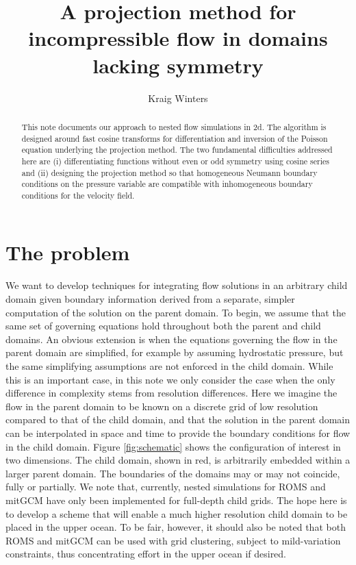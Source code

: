 \documentclass{jfm-like}
\title{A projection method for incompressible flow in domains lacking symmetry}
\author{Kraig Winters
  }
\affiliation{Scripps Institution of Oceanography, University of California San Diego,
La Jolla, CA 92093, USA
}
\begin{document}
\maketitle

\begin{abstract}
This note documents our approach to nested flow simulations in 2d. The algorithm is designed around fast cosine transforms for differentiation and inversion of the Poisson equation
underlying the projection method. The two fundamental difficulties addressed here are (i) differentiating functions without even or odd symmetry using cosine series and (ii) designing
the projection method so that homogeneous Neumann boundary conditions on the pressure variable are compatible with  inhomogeneous boundary conditions for the velocity field.
\end{abstract}


\section{The problem}
We want to develop techniques for integrating flow solutions in an arbitrary child domain given boundary information derived from a separate, simpler computation of the solution on the parent domain.
To begin, we assume that the same set of governing equations hold throughout both the parent and child domains. An obvious extension is when the equations governing the flow in the parent domain
are simplified, for example by assuming hydrostatic pressure, but the same simplifying assumptions are not enforced in the child domain. While this is an important case, in this note we only consider the
case when the only difference in complexity stems from resolution differences. Here we imagine the flow in the parent domain to be known on a discrete grid of low resolution compared to that of the child domain,
and that the solution in the parent domain can be interpolated in space and time to provide the boundary conditions for flow in the child domain. Figure \ref{fig:schematic} shows the configuration of interest
in two dimensions. The child domain, shown in red, is arbitrarily embedded within a larger parent domain. The boundaries of the domains may or may not coincide, fully or partially. We note that, currently,
nested simulations for ROMS and mitGCM have only been implemented for full-depth child grids. The hope here is to develop a scheme that will enable a much higher resolution child domain to be placed in the upper ocean.
To be fair, however, it should also be noted that both ROMS and mitGCM can be used with grid clustering, subject to mild-variation constraints, thus concentrating effort in the upper ocean if desired.
\end{document}
